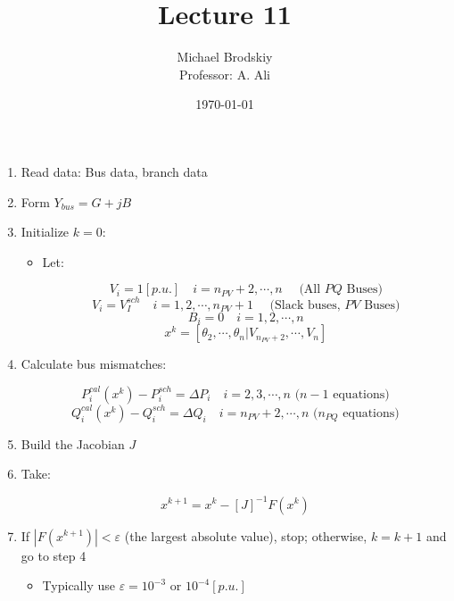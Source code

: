 


\title{Lecture 11}
\date{\today}
\author{Michael Brodskiy\\ \small Professor: A. Ali}



\maketitle

\begin{enumerate}

  \item Read data: Bus data, branch data

  \item Form $Y_{bus}=G+jB$

  \item Initialize $k=0$:

    \begin{itemize}

      \item Let:

        $$V_i=1[p.u.]\quad i=n_{PV}+2,\cdots,n\quad\text{ (All $PQ$ Buses)}$$
        $$V_i=V_I^{sch}\quad i=1,2,\cdots,n_{PV}+1\quad\text{ (Slack buses, $PV$ Buses)}$$
        $$B_i=0\quad i=1,2,\cdots,n$$
        $$x^{k}=\left[ \theta_2,\cdots,\theta_n\Big| V_{n_{PV}+2},\cdots,V_{n} \right]$$

    \end{itemize}

  \item Calculate bus mismatches:

    $$P_i^{cal}(x^k)-P_i^{sch}=\Delta P_i\quad i=2,3,\cdots,n\text{ ($n-1$ equations)}$$
    $$Q_i^{cal}(x^k)-Q_i^{sch}=\Delta Q_i\quad i=n_{PV}+2,\cdots,n\text{ ($n_{PQ}$ equations)}$$

  \item Build the Jacobian $J$

  \item Take:

    $$x^{k+1}=x^k-[J]^{-1}F(x^k)$$

  \item If $|F(x^{k+1})|<\varepsilon$ (the largest absolute value), stop; otherwise, $k=k+1$ and go to step 4

    \begin{itemize}

      \item Typically use $\varepsilon=10^{-3}\text{ or }10^{-4}[p.u.]$

    \end{itemize}

\end{enumerate}


